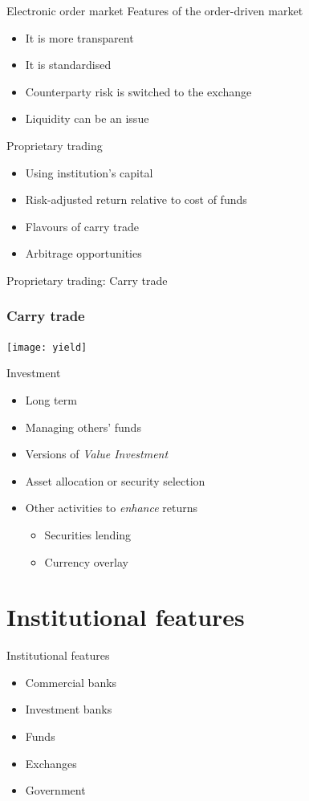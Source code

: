 \documentclass[14pt,xcolor=pdftex,dvipsnames,table]{beamer}\usepackage[]{graphicx}\usepackage[]{color}
\begin{document}
\begin{frame}{Electronic order market}
Features of the order-driven market
\pause
\begin{itemize}[<+-| alert@+>]
\item It is more transparent
\item It is standardised
\item Counterparty risk is switched to the exchange
\item Liquidity can be an issue
\end{itemize}
\end{frame}


\begin{frame}{Proprietary trading}
\begin{itemize}[<+-| alert@+>]
\item Using institution's capital 
\item Risk-adjusted return relative to cost of funds
\item Flavours of carry trade
\item Arbitrage opportunities
\end{itemize}
\end{frame}

\begin{frame}{Proprietary trading: Carry trade}
\frametitle{Carry trade}
\begin{center}
\texttt{[image: yield]}
\end{center}
\end{frame}

\begin{frame}{Investment}
\begin{itemize}[<+-| alert@+>]
\item Long term 
\item Managing others' funds
\item Versions of \emph{Value Investment}
\item Asset allocation or security selection
\item Other activities to \emph{enhance} returns
\begin{itemize}
\item Securities lending
\item Currency overlay
\end{itemize}
\end{itemize}
\end{frame}

\section{Institutional features}
\begin{frame}{Institutional features}
\begin{itemize}
\item Commercial banks
\item Investment banks
\item Funds
\item Exchanges
\item Government
\end{itemize}
\end{frame}
\end{document}
